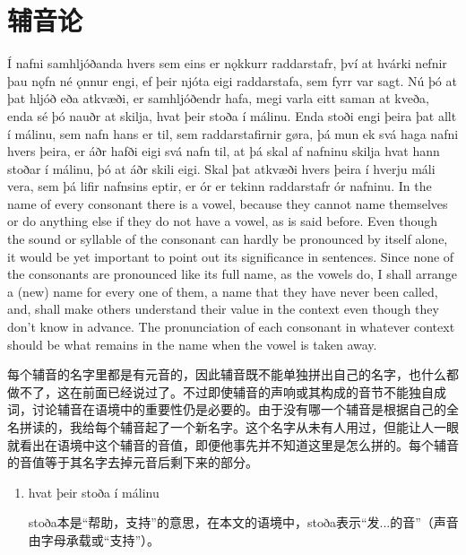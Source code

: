 \section{辅音论}
\begin{paracol}{2}
    Í nafni samhljóðanda hvers sem eins er nǫkkurr raddarstafr, því at hvárki nefnir þau nǫfn né ǫnnur engi, ef þeir njóta eigi raddarstafa, sem fyrr var sagt. Nú þó at þat hljóð eða atkvæði, er samhljóðendr hafa, megi varla eitt saman at kveða, enda sé þó nauðr at skilja, hvat þeir stoða í málinu. Enda stoði engi þeira þat allt í málinu, sem nafn hans er til, sem raddarstafirnir gøra, þá mun ek svá haga nafni hvers þeira, er áðr hafði eigi svá nafn til, at þá skal af nafninu skilja hvat hann stoðar í málinu, þó at áðr skili eigi. Skal þat atkvæði hvers þeira í hverju máli vera, sem þá lifir nafnsins eptir, er ór er tekinn raddarstafr ór nafninu.
    \switchcolumn
    In the name of every consonant there is a vowel, because they cannot name themselves or do anything else if they do not have a vowel, as is said before. Even though the sound or syllable of the consonant can hardly be pronounced by itself alone, it would be yet important to point out its significance in sentences. Since none of the consonants are pronounced like its full name, as the vowels do, I shall arrange a (new) name for every one of them, a name that they have never been called, and, shall make others understand their value in the context even though they don't know in advance. The pronunciation of each consonant in whatever context should be what remains in the name when the vowel is taken away.
\end{paracol}
\begin{translation*}{}
    每个辅音的名字里都是有元音的，因此辅音既不能单独拼出自己的名字，也什么都做不了，这在前面已经说过了。不过即使辅音的声响或其构成的音节不能独自成词，讨论辅音在语境中的重要性仍是必要的。由于没有哪一个辅音是根据自己的全名拼读的，我给每个辅音起了一个新名字。这个名字从未有人用过，但能让人一眼就看出在语境中这个辅音的音值，即便他事先并不知道这里是怎么拼的。每个辅音的音值等于其名字去掉元音后剩下来的部分。
\end{translation*}
\begin{grammar*}{}
    \begin{enumerate}[leftmargin=*]
        \item hvat þeir stoða í málinu

              stoða本是“帮助，支持”的意思，在本文的语境中，stoða表示“发...的音”（声音由字母承载或“支持”）。
    \end{enumerate}
\end{grammar*}
